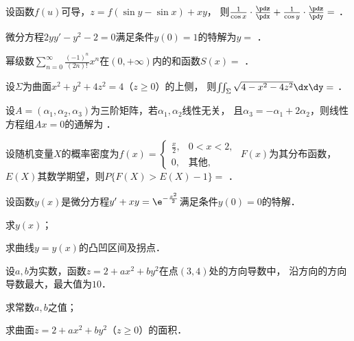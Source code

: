 \documentclass[plain,noanswer,medmath]{../../template/jnuexam}
\begin{document}


\begin{problem}
设函数$f(u)$可导，$z = f(\sin y - \sin x) + xy$，
则$\frac{1}{\cos x} \cdot \frac{\pdz}{\pdx} + \frac{1}{\cos y} \cdot \frac{\pdz}{\pdy} =$ \fillin{}．
\end{problem}


\begin{problem}
微分方程$2yy' - y^2 - 2 = 0$满足条件$y(0) = 1$的特解为$y =$ \fillin{}．
\end{problem}


\begin{problem}
幂级数$\sum_{n = 0}^{\infty}\frac{(- 1)^n}{(2n)!}x^n$在$(0, +\infty)$内的和函数$S(x) =$ \fillin{}．
\end{problem}


\begin{problem}
设$\Sigma$为曲面$x^2 + y^2 + 4z^2 = 4$（$z \ge 0$）的上侧，
则$\iint_{\Sigma}\sqrt{4 - x^2 - 4z^2} \dx\dy =$ \fillin{}．
\end{problem}


\begin{problem}
设$A = (\alpha_1,\alpha_2,\alpha_3)$为三阶矩阵，若$\alpha_1,\alpha_2$线性无关，
且$\alpha_3 = - \alpha_1 + 2\alpha_2$，则线性方程组$Ax = 0$的通解为 \fillin{}．
\end{problem}


\begin{problem}
设随机变量$X$的概率密度为$f(x) = \begin{cases}
  \frac{x}{2}, & 0 < x < 2, \\
            0, & \text{其他},
\end{cases}$ $F(x)$为其分布函数，$E(X)$其数学期望，则$P\{F(X) > E(X) - 1\} =$ \fillin{}．
\end{problem}




\begin{problem}[points=10]
设函数$y(x)$是微分方程$y' + xy = \e^{- \frac{x^2}{2}}$满足条件$y(0) = 0$的特解．\par
\begin{enumerate*}
\item 求$y(x)$；
\item 求曲线$y = y(x)$的凸凹区间及拐点．
\end{enumerate*}
\end{problem}


\begin{problem}[points=10]
设$a,b$为实数，函数$z = 2 + ax^2 + by^2$在点$(3,4)$处的方向导数中，
沿方向的方向导数最大，最大值为$10$．\par
\begin{enumerate*}
\item 求常数$a,b$之值；
\item 求曲面$z = 2 + ax^2 + by^2$（$z \ge 0$）的面积．
\end{enumerate*}
\end{problem}
\end{document}
